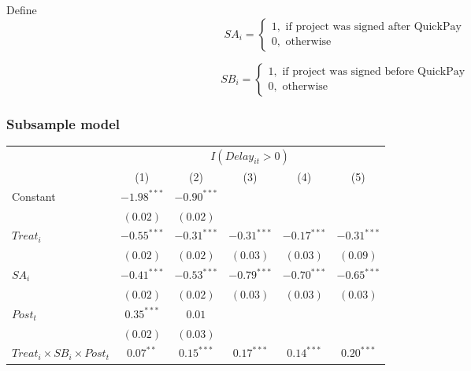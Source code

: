 \documentclass[
]{article}
\begin{document}
Define
\[ SA_i = \begin{cases} 1, \text{ if project was signed after QuickPay}\\
0, \text{ otherwise} \end{cases}\]

\[ SB_i = \begin{cases} 1, \text{ if project was signed before QuickPay}\\
0, \text{ otherwise} \end{cases}\]

\hypertarget{subsample-model}{%
\subsubsection{Subsample model}\label{subsample-model}}

\begin{table}
\begin{center}
\begin{tabular}{l c c c c c}
\hline
 & \multicolumn{5}{c}{$I(Delay_{it}>0)$} \\
\cline{2-6}
 & (1) & (2) & (3) & (4) & (5) \\
\hline
Constant                                   & $-1.98^{***}$ & $-0.90^{***}$ &               &               &               \\
                                           & $(0.02)$      & $(0.02)$      &               &               &               \\
$Treat_i$                                  & $-0.55^{***}$ & $-0.31^{***}$ & $-0.31^{***}$ & $-0.17^{***}$ & $-0.31^{***}$ \\
                                           & $(0.02)$      & $(0.02)$      & $(0.03)$      & $(0.03)$      & $(0.09)$      \\
$SA_i$                                     & $-0.41^{***}$ & $-0.53^{***}$ & $-0.79^{***}$ & $-0.70^{***}$ & $-0.65^{***}$ \\
                                           & $(0.02)$      & $(0.02)$      & $(0.03)$      & $(0.03)$      & $(0.03)$      \\
$Post_t$                                   & $0.35^{***}$  & $0.01$        &               &               &               \\
                                           & $(0.02)$      & $(0.03)$      &               &               &               \\
$Treat_i \times SB_i \times Post_t$        & $0.07^{**}$   & $0.15^{***}$  & $0.17^{***}$  & $0.14^{***}$  & $0.20^{***}$  \\

\end{tabular}
\end{center}
\end{table}
\end{document}
